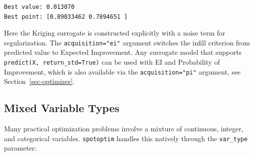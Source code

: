 \documentclass[
  twocolumn]{article}
\begin{document}
\begin{verbatim}
Best value: 0.013070
Best point: [0.89033462 0.7894651 ]
\end{verbatim}

Here the Kriging surrogate is constructed explicitly with a noise term
for regularization. The \texttt{acquisition="ei"} argument switches the
infill criterion from predicted value to Expected Improvement. Any
surrogate model that supports \texttt{predict(X,\ return\_std=True)} can
be used with EI and Probability of Improvement, which is also available
via the \texttt{acquisition="pi"} argument, see
Section~\ref{sec-optimizer}.

\subsection{Mixed Variable Types}\label{mixed-variable-types}

Many practical optimization problems involve a mixture of continuous,
integer, and categorical variables. \texttt{spotoptim} handles this
natively through the \texttt{var\_type} parameter:
\end{document}
